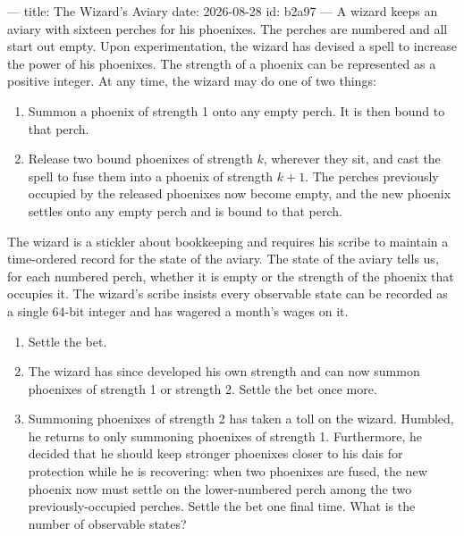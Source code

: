 ---
title: The Wizard's Aviary
date: 2026-08-28
id: b2a97
---
A wizard keeps an aviary with sixteen perches for his phoenixes. The perches are numbered and all start out empty. Upon experimentation, the wizard has devised a spell to increase the power of his phoenixes. The strength of a phoenix can be represented as a positive integer. At any time, the wizard may do one of two things:

\begin{enumerate}
\item Summon a phoenix of strength 1 onto any empty perch. It is then bound to that perch.
\item Release two bound phoenixes of strength $k$, wherever they sit, and cast the spell to fuse them into a phoenix of strength $k+1$. The perches previously occupied by the released phoenixes now become empty, and the new phoenix settles onto any empty perch and is bound to that perch.
\end{enumerate}

The wizard is a stickler about bookkeeping and requires his scribe to maintain a time-ordered record for the state of the aviary. The state of the aviary tells us, for each numbered perch, whether it is empty or the strength of the phoenix that occupies it. The wizard's scribe insists every observable state can be recorded as a single 64-bit integer and has wagered a month's wages on it.

\begin{enumerate}
\item[(a)] Settle the bet.
\item[(b)] The wizard has since developed his own strength and can now summon phoenixes of strength 1 or strength 2. Settle the bet once more.
\item[(c)] Summoning phoenixes of strength 2 has taken a toll on the wizard. Humbled, he returns to only summoning phoenixes of strength 1. Furthermore, he decided that he should keep stronger phoenixes closer to his dais for protection while he is recovering: when two phoenixes are fused, the new phoenix now must settle on the lower-numbered perch among the two previously-occupied perches. Settle the bet one final time. What is the number of observable states?
\end{enumerate}
